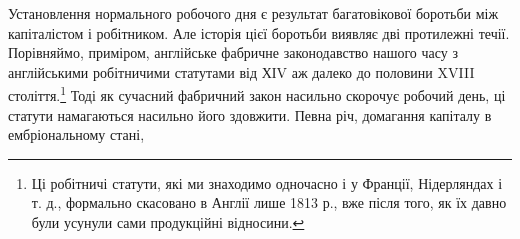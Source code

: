 Установлення нормального робочого дня є результат багатовікової
боротьби між капіталістом і робітником. Але історія цієї
боротьби виявляє дві протилежні течії. Порівняймо, приміром,
англійське фабричне законодавство нашого часу з англійськими
робітничими статутами від ХІV аж далеко до половини XVIII
століття.\footnote{Ці робітничі статути, які ми знаходимо одночасно і у Франції,
Нідерляндах і т. д., формально скасовано в Англії лише 1813 р., вже після
того, як їх давно були усунули сами продукційні відносини.} Тоді як сучасний фабричний закон насильно скорочує
робочий день, ці статути намагаються насильно його здовжити.
Певна річ, домагання капіталу в ембріональному стані,
\parbreak{}  %
